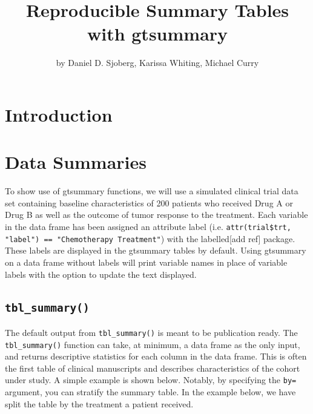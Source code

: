 \title{Reproducible Summary Tables with gtsummary}
\author{by Daniel D. Sjoberg, Karissa Whiting, Michael Curry}

\maketitle


\section{Introduction}

\section{Data Summaries}

To show use of gtsummary functions, we will use a simulated clinical trial data set containing baseline characteristics of 200 patients who received Drug A or Drug B as well as the outcome of tumor response to the treatment.
Each variable in the data frame has been assigned an attribute label (i.e. \texttt{attr(trial\$trt, "label") == "Chemotherapy Treatment"}) with the labelled[add ref] package. 
These labels are displayed in the {gtsummary} tables by default. Using {gtsummary} on a data frame without labels will print variable names in place of variable labels with the option to update the text displayed.



\subsection{\texorpdfstring{\texttt{tbl\_summary()}}{tbl\_summary()}}

The default output from \texttt{tbl\_summary()} is meant to be publication ready.
The \texttt{tbl\_summary()} function can take, at minimum, a data frame as the only input, and returns descriptive statistics for each column in the data frame.
This is often the first table of clinical manuscripts and describes characteristics of the cohort under study.
A simple example is shown below.
Notably, by specifying the \texttt{by=} argument, you can stratify the summary table. 
In the example below, we have split the table by the treatment a patient received. 


